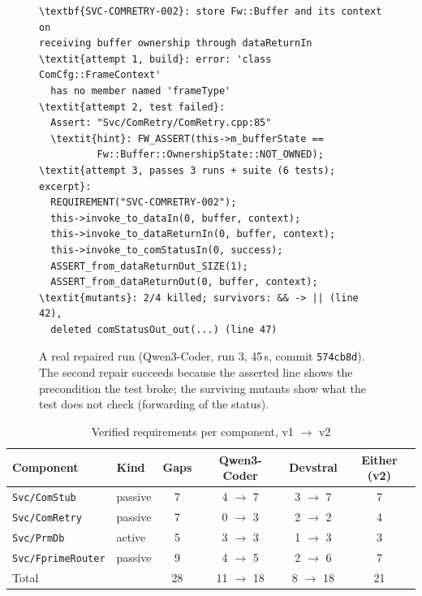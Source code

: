 \documentclass[conference]{IEEEtran}
\newcommand{\tool}[1]{\texttt{#1}}
\begin{document}
\begin{figure}[t]
\centering
\begin{minipage}{0.965\columnwidth}
\begin{Verbatim}[frame=single, fontsize=\scriptsize, commandchars=\\\{\}, framesep=1mm]
\textbf{SVC-COMRETRY-002}: store Fw::Buffer and its context on
receiving buffer ownership through dataReturnIn
\textit{attempt 1, build}: error: 'class ComCfg::FrameContext'
  has no member named 'frameType'
\textit{attempt 2, test failed}:
  Assert: "Svc/ComRetry/ComRetry.cpp:85"
  \textit{hint}: FW_ASSERT(this->m_bufferState ==
          Fw::Buffer::OwnershipState::NOT_OWNED);
\textit{attempt 3, passes 3 runs + suite (6 tests); excerpt}:
  REQUIREMENT("SVC-COMRETRY-002");
  this->invoke_to_dataIn(0, buffer, context);
  this->invoke_to_dataReturnIn(0, buffer, context);
  this->invoke_to_comStatusIn(0, success);
  ASSERT_from_dataReturnOut_SIZE(1);
  ASSERT_from_dataReturnOut(0, buffer, context);
\textit{mutants}: 2/4 killed; survivors: && -> || (line 42),
  deleted comStatusOut_out(...) (line 47)
\end{Verbatim}
\end{minipage}
\caption{A real repaired run (Qwen3-Coder, run 3, 45\,s, commit \texttt{574cb8d}). The second repair succeeds
because the asserted line shows the precondition the test broke; the surviving mutants show what the test does not
check (forwarding of the status).}
\label{fig:example}
\end{figure}

\begin{table}[t]
\caption{Verified requirements per component, v1 $\rightarrow$ v2}
\label{tab:modules}
\centering
\footnotesize
\setlength{\tabcolsep}{3pt}
\begin{tabular}{@{}llcccc@{}}
\toprule
Component & Kind & Gaps & Qwen3-Coder & Devstral & Either (v2) \\
\midrule
\tool{Svc/ComStub} & passive & 7 & 4 $\rightarrow$ 7 & 3 $\rightarrow$ 7 & 7 \\
\tool{Svc/ComRetry} & passive & 7 & 0 $\rightarrow$ 3 & 2 $\rightarrow$ 2 & 4 \\
\tool{Svc/PrmDb} & active & 5 & 3 $\rightarrow$ 3 & 1 $\rightarrow$ 3 & 3 \\
\tool{Svc/FprimeRouter} & passive & 9 & 4 $\rightarrow$ 5 & 2 $\rightarrow$ 6 & 7 \\
\midrule
Total & & 28 & 11 $\rightarrow$ 18 & 8 $\rightarrow$ 18 & 21 \\
\bottomrule
\end{tabular}
\end{table}
\end{document}
